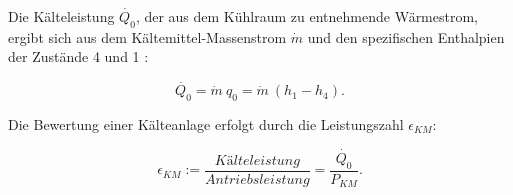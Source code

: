 Die Kälteleistung $\dot{Q_0}$, der aus dem Kühlraum zu entnehmende Wärmestrom, ergibt sich aus dem Kältemittel-Massenstrom $\dot{m}$ und den spezifischen Enthalpien der Zustände 4 und 1 :

\begin{equation}
	\dot{Q_0} = \dot{m}~ q_0 = \dot{m}~ (h_1 - h_4).
	\label{eq:Kälteleistung}
\end{equation}




Die Bewertung einer Kälteanlage erfolgt durch die Leistungszahl $\epsilon_{KM}$: 

\begin{equation}
	\epsilon_{KM} := \frac{Kälteleistung}{Antriebsleistung} =\frac{\dot{Q_0}}{P_{KM}}.
	\label{eq:Leistungszahl}
\end{equation}


%